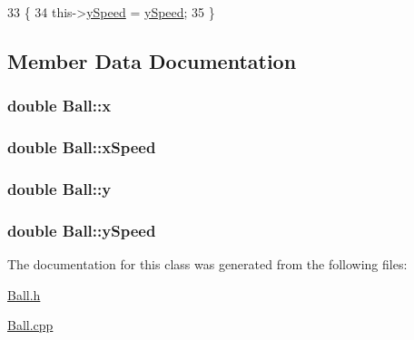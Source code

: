 \begin{DoxyCode}
33                                   \{
34    this->\hyperlink{classBall_ab69d19321c76e52ef393c83d0d476f91}{ySpeed} = \hyperlink{classBall_ab69d19321c76e52ef393c83d0d476f91}{ySpeed};
35 \}
\end{DoxyCode}


\subsection{Member Data Documentation}
\subsubsection[{\texorpdfstring{x}{x}}]{\setlength{\rightskip}{0pt plus 5cm}double Ball\+::x\hspace{0.3cm}{\ttfamily [private]}}\hypertarget{classBall_a60894aab5e27e93bacf2393b9110a049}{}\label{classBall_a60894aab5e27e93bacf2393b9110a049}
\subsubsection[{\texorpdfstring{x\+Speed}{xSpeed}}]{\setlength{\rightskip}{0pt plus 5cm}double Ball\+::x\+Speed\hspace{0.3cm}{\ttfamily [private]}}\hypertarget{classBall_aa5e337441f77e5c2b904dbd4340eaa20}{}\label{classBall_aa5e337441f77e5c2b904dbd4340eaa20}
\subsubsection[{\texorpdfstring{y}{y}}]{\setlength{\rightskip}{0pt plus 5cm}double Ball\+::y\hspace{0.3cm}{\ttfamily [private]}}\hypertarget{classBall_a17d73231eab81d0e74cf28d0068fe5cb}{}\label{classBall_a17d73231eab81d0e74cf28d0068fe5cb}
\subsubsection[{\texorpdfstring{y\+Speed}{ySpeed}}]{\setlength{\rightskip}{0pt plus 5cm}double Ball\+::y\+Speed\hspace{0.3cm}{\ttfamily [private]}}\hypertarget{classBall_ab69d19321c76e52ef393c83d0d476f91}{}\label{classBall_ab69d19321c76e52ef393c83d0d476f91}


The documentation for this class was generated from the following files\+:\begin{DoxyCompactItemize}
\item 
\hyperlink{Ball_8h}{Ball.\+h}\item 
\hyperlink{Ball_8cpp}{Ball.\+cpp}\end{DoxyCompactItemize}
